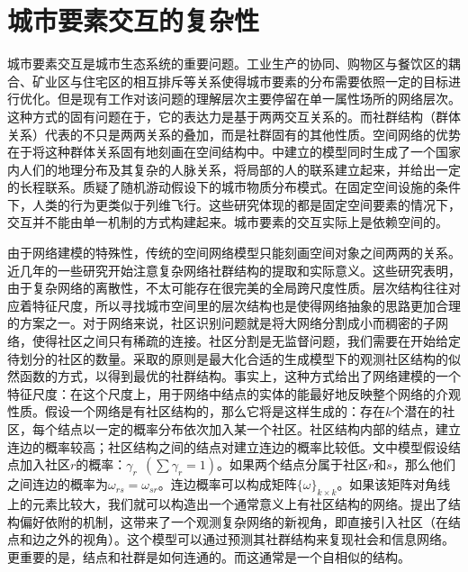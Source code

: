 \section{城市要素交互的复杂性}

城市要素交互是城市生态系统的重要问题\cite{duneier1999talking}。工业生产的协同、购物区与餐饮区的耦合、矿业区与住宅区的相互排斥等关系使得城市要素的分布需要依照一定的目标进行优化。但是现有工作对该问题的理解层次主要停留在单一属性场所的网络层次。这种方式的固有问题在于，它的表达力是基于两两交互关系的。而社群结构（群体关系）代表的不只是两两关系的叠加，而是社群固有的其他性质\cite{durrett2019probability}。空间网络的优势在于将这种群体关系固有地刻画在空间结构中。\cite{PhysRevX.4.011008}中建立的模型同时生成了一个国家内人们的地理分布及其复杂的人脉关系，将局部的人的联系建立起来，并给出一定的长程联系。\cite{PhysRevLett.123.208002}质疑了随机游动假设下的城市物质分布模式。在固定空间设施的条件下，人类的行为更类似于列维飞行。这些研究体现的都是固定空间要素的情况下，交互并不能由单一机制的方式构建起来。城市要素的交互实际上是依赖空间的。

由于网络建模的特殊性，传统的空间网络模型只能刻画空间对象之间两两的关系。近几年的一些研究\cite{newman2016estimating}开始注意复杂网络社群结构的提取和实际意义。这些研究表明，由于复杂网络的离散性，不太可能存在很完美的全局跨尺度性质\cite{PhysRevE.83.066116}。层次结构往往对应着特征尺度\cite{verma2016emergence}，所以寻找城市空间里的层次结构也是使得网络抽象的思路更加合理的方案之一。对于网络来说，社区识别问题就是将大网络分割成小而稠密的子网络，使得社区之间只有稀疏的连接。社区分割是无监督问题，我们需要在开始给定待划分的社区的数量。\cite{newman2016estimating}采取的原则是最大化合适的生成模型下的观测社区结构的似然函数的方式，以得到最优的社群结构。事实上，这种方式给出了网络建模的一个特征尺度：在这个尺度上，用于网络中结点的实体的能最好地反映整个网络的介观性质。假设一个网络是有社区结构的，那么它将是这样生成的：存在$k$个潜在的社区，每个结点以一定的概率分布依次加入某一个社区。社区结构内部的结点，建立连边的概率较高；社区结构之间的结点对建立连边的概率比较低。文中模型假设结点加入社区$r$的概率：$\gamma_r\ \ (\sum \gamma_r = 1)$。如果两个结点分属于社区$r$和$s$，那么他们之间连边的概率为$\omega_{rs}=\omega_{sr}$。连边概率可以构成矩阵$\{\omega\}_{k\times k}$。如果该矩阵对角线上的元素比较大，我们就可以构造出一个通常意义上有社区结构的网络。\cite{hebert2011structural}提出了结构偏好依附的机制，这带来了一个观测复杂网络的新视角，即直接引入社区（在结点和边之外的视角）。这个模型可以通过预测其社群结构来复现社会和信息网络。更重要的是，结点和社群是如何连通的。而这通常是一个自相似的结构。

